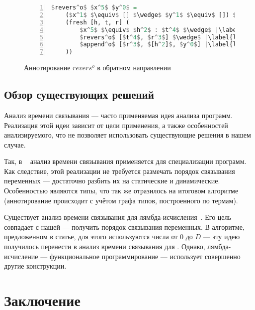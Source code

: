\documentclass[conference,american,russian]{IEEEtran}
\begin{document}
\begin{figure}[h!]
  \begin{center}
  \begin{minipage}{0.3\textwidth}
  \begin{lstlisting}[language=Haskell, frame=single, numbers=left,numberstyle=\small, escapechar=|]
  $revers^o$ $x^5$ $y^0$ =
    ($x^1$ $\equiv$ [] $\wedge$ $y^1$ $\equiv$ []) $\vee$ |\label{line:r2ma2}|
    (fresh [h, t, r] (
        $x^5$ $\equiv$ $h^2$ : $t^4$ $\wedge$ |\label{line:r2ma4}|
        $revers^o$ [$t^4$, $r^3$] $\wedge$ |\label{line:r2ma5}|
        $append^o$ [$r^3$, $[h^2]$, $y^0$] |\label{line:r2ma6}|
    ))
    \end{lstlisting}
  \end{minipage}
  \end{center}
  \caption{Аннотирование $revers^o$ в обратном направлении}
  \label{lst:reversoANN2}
\end{figure}

\subsection{Обзор существующих решений}

Анализ времени связывания --- часто применяемая идея анализа программ.
Реализация этой идеи зависит от цели применения, а также особенностей анализируемого, что не позволяет использовать существующие решения в нашем случае.

Так, в \mercury{}~\cite{vanhoof2004binding} анализ времени связывания применяется для специализации программ. Как следствие, этой реализации не требуется размечать порядок связывания переменных --- достаточно разбить их на статические и динамические. Особенностью \mercury{} являются типы, что так же отразилось на итоговом алгоритме (аннотирование происходит с учётом графа типов, построенного по термам).

Существует анализ времени связывания для лямбда-исчисления~\cite{Thiemann1997AUF}. Его цель совпадает с нашей --- получить порядок связывания переменных. В алгоритме, предложенном в статье, для этого используются числа от $0$ до $D$ --- эту идею получилось перенести в анализ времени связывания для \miniKanren{}. Однако, лямбда-исчисление --- функциональное программирование --- использует совершенно другие конструкции.

\section{Заключение}\label{conclusion}
\end{document}
